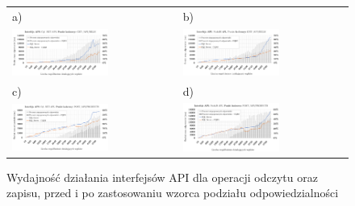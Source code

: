 \begin{figure}[htb]
  \advance\leftskip-1.7cm
    \begin{tabular}{@{}ll@{}}
    a) & b) \\
    \includegraphics[width=0.6\textwidth]{rys05/dotnet-vs-cqrs.pdf} & \includegraphics[width=0.6\textwidth]{rys05/nodejs-vs-cqrs.pdf} \\
    c) & d) \\
    \includegraphics[width=0.6\textwidth]{rys05/dotnet-vs-cqrs-write.pdf} & \includegraphics[width=0.6\textwidth]{rys05/nodejs-vs-cqrs-write.pdf}
    \end{tabular}
  \caption{Wydajność działania interfejsów API dla operacji odczytu oraz zapisu, przed i po zastosowaniu wzorca podziału odpowiedzialności}
  \label{fig:3tier-vs-cqrs}
\end{figure}

